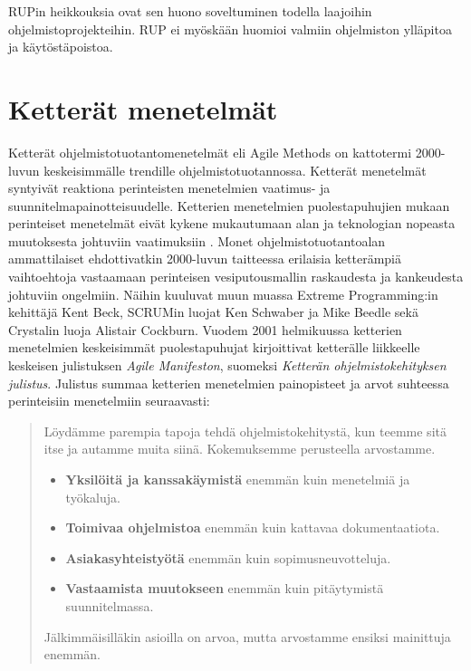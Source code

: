\documentclass[finnish,12pt]{tktltiki2}
\theoremstyle{definition}
\theoremstyle{remark}
\begin{document}
RUPin heikkouksia ovat sen huono soveltuminen todella laajoihin ohjelmistoprojekteihin\cite{Ramsin:2008:PRO:1322432.1322435, Ruparelia:2010:SDL:1764810.1764814}. RUP ei myöskään huomioi valmiin ohjelmiston ylläpitoa ja käytöstäpoistoa\cite{Ramsin:2008:PRO:1322432.1322435}. 


\section{Ketterät menetelmät}

Ketterät ohjelmistotuotantomenetelmät eli Agile Methods on kattotermi 2000-luvun keskeisimmälle trendille ohjelmistotuotannossa. Ketterät menetelmät syntyivät reaktiona perinteisten menetelmien vaatimus- ja suunnitelmapainotteisuudelle. Ketterien menetelmien puolestapuhujien mukaan perinteiset menetelmät eivät kykene mukautumaan alan ja teknologian nopeasta muutoksesta johtuviin vaatimuksiin \cite{DBLP:journals/ac/CohenLC04}. Monet ohjelmistotuotantoalan ammattilaiset ehdottivatkin 2000-luvun taitteessa erilaisia ketterämpiä vaihtoehtoja vastaamaan perinteisen vesiputousmallin raskaudesta ja kankeudesta johtuviin ongelmiin. Näihin kuuluvat muun muassa Extreme Programming:in kehittäjä Kent Beck, SCRUMin luojat Ken Schwaber ja Mike Beedle sekä Crystalin luoja Alistair Cockburn\cite{Sommerville10,DBLP:journals/ac/CohenLC04}. Vuodem 2001 helmikuussa ketterien menetelmien keskeisimmät puolestapuhujat kirjoittivat ketterälle liikkeelle keskeisen julistuksen \textit{Agile Manifeston}, suomeksi \textit{Ketterän ohjelmistokehityksen julistus}. Julistus summaa ketterien menetelmien painopisteet ja arvot suhteessa perinteisiin menetelmiin seuraavasti: 

\begin{quotation}
Löydämme parempia tapoja tehdä ohjelmistokehitystä, kun teemme sitä
itse ja autamme muita siinä. Kokemuksemme perusteella arvostamme.
\begin{itemize}
\item\textbf{Yksilöitä ja kanssakäymistä} enemmän kuin menetelmiä ja työkaluja. 
\item\textbf{Toimivaa ohjelmistoa} enemmän kuin kattavaa dokumentaatiota.
\item\textbf{Asiakasyhteistyötä} enemmän kuin sopimusneuvotteluja.
\item\textbf{Vastaamista muutokseen} enemmän kuin pitäytymistä suunnitelmassa.
\end{itemize}
Jälkimmäisilläkin asioilla on arvoa, mutta
arvostamme ensiksi mainittuja enemmän. 
\end{quotation}
\end{document}
